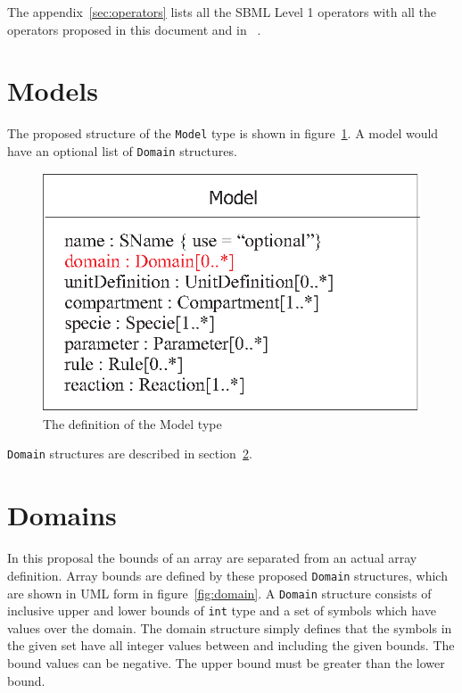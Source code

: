 \documentclass{cekarticle}
\begin{document}
The appendix~\ref{sec:operators} lists all the SBML Level 1
operators with all the operators proposed in this document and in
~\citet{finney:2002c}.

\section{Models}

The proposed structure of the \texttt{Model} type is shown in
figure~\ref{fig:model}. A model would have an optional list of
\texttt{Domain} structures.

\begin{figure}[h]
  \vspace*{8pt}
  \centering
  \includegraphics[scale = 0.7]{model}
  \caption{The definition of the Model type}
  \label{fig:model}
\end{figure}

\texttt{Domain} structures are described in
section~\ref{sec:domain}.

\section{Domains}
\label{sec:domain}

In this proposal the bounds of an array are separated from an
actual array definition.  Array bounds are defined by these
proposed \texttt{Domain} structures, which are shown in UML form
in figure~\ref{fig:domain}.  A \texttt{Domain} structure consists
of inclusive upper and lower bounds of \texttt{int} type and a
set of symbols which have values over the domain.  The domain
structure simply defines that the symbols in the given set have
all integer values between and including the given bounds.  The
bound values can be negative.  The upper bound must be greater
than the lower bound.
\end{document}
